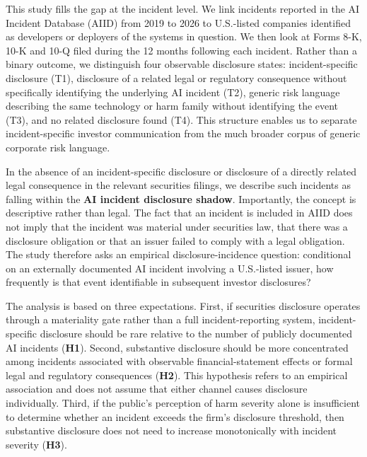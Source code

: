 \documentclass[utf8]{FrontiersinHarvard}
\begin{document}
This study fills the gap at the incident level. We link incidents reported in the AI Incident Database (AIID) from 2019 to 2026 to U.S.-listed companies identified as developers or deployers of the systems in question. We then look at Forms 8-K, 10-K and 10-Q filed during the 12 months following each incident. Rather than a binary outcome, we distinguish four observable disclosure states: incident-specific disclosure (T1), disclosure of a related legal or regulatory consequence without specifically identifying the underlying AI incident (T2), generic risk language describing the same technology or harm family without identifying the event (T3), and no related disclosure found (T4). This structure enables us to separate incident-specific investor communication from the much broader corpus of generic corporate risk language.

In the absence of an incident-specific disclosure or disclosure of a directly related legal consequence in the relevant securities filings, we describe such incidents as falling within the \textbf{AI incident disclosure shadow}. Importantly, the concept is descriptive rather than legal. The fact that an incident is included in AIID does not imply that the incident was material under securities law, that there was a disclosure obligation or that an issuer failed to comply with a legal obligation. The study therefore asks an empirical disclosure-incidence question: conditional on an externally documented AI incident involving a U.S.-listed issuer, how frequently is that event identifiable in subsequent investor disclosures?

The analysis is based on three expectations. First, if securities disclosure operates through a materiality gate rather than a full incident-reporting system, incident-specific disclosure should be rare relative to the number of publicly documented AI incidents (\textbf{H1}). Second, substantive disclosure should be more concentrated among incidents associated with observable financial-statement effects or formal legal and regulatory consequences (\textbf{H2}). This hypothesis refers to an empirical association and does not assume that either channel causes disclosure individually. Third, if the public's perception of harm severity alone is insufficient to determine whether an incident exceeds the firm's disclosure threshold, then substantive disclosure does not need to increase monotonically with incident severity (\textbf{H3}).
\end{document}

